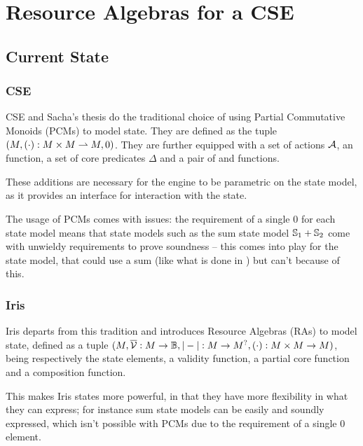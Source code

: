 \chapter{Resource Algebras for a CSE}

\section{Current State}


\subsection{CSE}

CSE and Sacha's thesis do the traditional choice of using Partial Commutative Monoids (PCMs) to model state. They are defined as the tuple $(M, (\cdot):M\times M \rightharpoonup M, 0)$. They are further equipped with a set of actions $\cal A$, an \execac{} function, a set of core predicates $\Delta$ and a pair of \consume{} and \produce{} functions.

These additions are necessary for the engine to be parametric on the state model, as it provides an interface for interaction with the state.

The usage of PCMs comes with issues: the requirement of a single 0 for each state model means that state models such as the sum state model $\mathbb S_1 + \mathbb S_2$ come with unwieldy requirements to prove soundness -- this comes into play for the  state model, that could use a sum (like what is done in \cite{iris-thesis}) but can't because of this.

\subsection{Iris}

Iris \cite{iris} departs from this tradition and introduces Resource Algebras (RAs) to model state, defined as a tuple $(M, \overline{\cal V}: M\rightarrow \mathbb{B}, |-|:M\rightarrow M^?, (\cdot):M\times M\rightarrow M)$, being respectively the state elements, a validity function, a partial core function and a composition function.

This makes Iris states more powerful, in that they have more flexibility in what they can express; for instance sum state models can be easily and soundly expressed, which isn't possible with PCMs due to the requirement of a single $0$ element.

